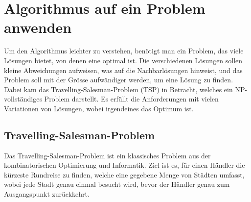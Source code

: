 %
%
%
%
\section{Algorithmus auf ein Problem anwenden
\label{buch:paper:varalg:section:find_problem}}
Um den Algorithmus leichter zu verstehen, benötigt man ein Problem, das 
viele Lösungen bietet, von denen eine optimal ist. Die verschiedenen 
Lösungen sollen kleine Abweichungen aufweisen, was auf die Nachbarlösungen hinweist, 
und das Problem soll mit der Grösse aufwändiger werden, um eine 
Lösung zu finden. Dabei kam das Travelling-Salesman-Problem (TSP) 
in Betracht, welches ein NP-vollständiges Problem darstellt. Es 
erfüllt die Anforderungen mit vielen Variationen von Lösungen, wobei
irgendeines das Optimum ist.

\subsection{Travelling-Salesman-Problem
\label{buch:paper:varalg:subsection:tsp}}
%
Das Travelling-Salesman-Problem ist ein klassisches Problem 
aus der kombinatorischen Optimierung und Informatik. Ziel ist es, 
%
%
für einen Händler die kürzeste Rundreise zu finden, welche eine 
gegebene Menge von Städten umfasst, wobei jede Stadt 
genau einmal besucht wird, bevor der Händler genau zum Ausgangspunkt 
zurückkehrt. 
